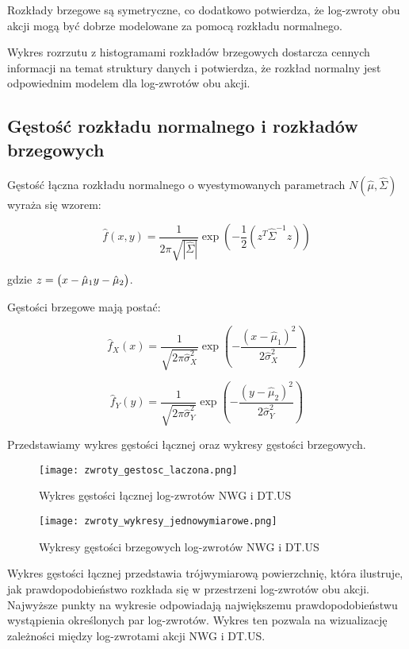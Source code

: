 \documentclass[a4paper,11pt]{article}
\def\\{\hfill\break}
\begin{document}
Rozkłady brzegowe są symetryczne, co dodatkowo potwierdza, że log-zwroty obu akcji mogą być dobrze modelowane za pomocą rozkładu normalnego.

Wykres rozrzutu z histogramami rozkładów brzegowych dostarcza cennych informacji na temat struktury danych i potwierdza, że rozkład normalny jest odpowiednim modelem dla log-zwrotów obu akcji.


\subsection{Gęstość rozkładu normalnego i rozkładów brzegowych}
Gęstość łączna rozkładu normalnego o wyestymowanych parametrach \(N(\hat{\mu}, \hat{\Sigma})\) wyraża się wzorem:

\[
\hat{f}(x, y) = \frac{1}{2\pi \sqrt{|\hat{\Sigma}|}} \exp \left( -\frac{1}{2} (z^T \hat{\Sigma}^{-1} z) \right)
\]

gdzie \(z = \begin{pmatrix}
x - \hat{\mu}_1 \\
y - \hat{\mu}_2
\end{pmatrix}\).

Gęstości brzegowe mają postać:

\[
\hat{f}_X(x) = \frac{1}{\sqrt{2\pi \hat{\sigma}_X^2}} \exp \left( -\frac{(x - \hat{\mu}_1)^2}{2\hat{\sigma}_X^2} \right)
\]

\[
\hat{f}_Y(y) = \frac{1}{\sqrt{2\pi \hat{\sigma}_Y^2}} \exp \left( -\frac{(y - \hat{\mu}_2)^2}{2\hat{\sigma}_Y^2} \right)
\]

Przedstawiamy wykres gęstości łącznej oraz wykresy gęstości brzegowych.

\begin{figure}[h]
\centering
\texttt{[image: zwroty\_gestosc\_laczona.png]}
\caption{Wykres gęstości łącznej log-zwrotów NWG i DT.US}
\end{figure}

\begin{figure}[h]
\centering
\texttt{[image: zwroty\_wykresy\_jednowymiarowe.png]}
\caption{Wykresy gęstości brzegowych log-zwrotów NWG i DT.US}
\end{figure}

Wykres gęstości łącznej przedstawia trójwymiarową powierzchnię, która ilustruje, jak prawdopodobieństwo rozkłada się w przestrzeni log-zwrotów obu akcji. Najwyższe punkty na wykresie odpowiadają największemu prawdopodobieństwu wystąpienia określonych par log-zwrotów. Wykres ten pozwala na wizualizację zależności między log-zwrotami akcji NWG i DT.US.
\end{document}
